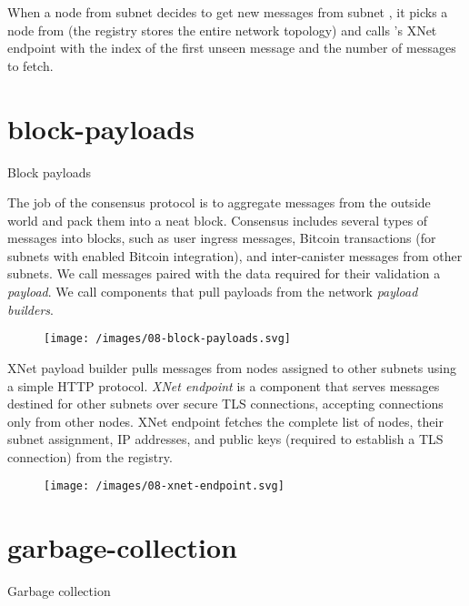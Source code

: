 \documentclass{article}
\begin{document}
When a node from subnet  decides to get new messages from subnet , it picks a node from  (the registry stores the entire network topology) and calls 's XNet endpoint with the index of the first unseen message and the number of messages to fetch.

\section{block-payloads}{Block payloads}

The job of the consensus protocol is to aggregate messages from the outside world and pack them into a neat block.
Consensus includes several types of messages into blocks, such as user ingress messages, Bitcoin transactions (for subnets with enabled Bitcoin integration), and inter-canister messages from other subnets.
We call messages paired with the data required for their validation a \emph{payload}.
We call components that pull payloads from the network \emph{payload builders}.

\begin{figure}[grayscale-diagram]
  \texttt{[image: /images/08-block-payloads.svg]}
\end{figure}

XNet payload builder pulls messages from nodes assigned to other subnets using a simple HTTP protocol.
\emph{XNet endpoint} is a component that serves messages destined for other subnets over secure TLS connections, accepting connections only from other nodes.
XNet endpoint fetches the complete list of nodes, their subnet assignment, IP addresses, and public keys (required to establish a TLS connection) from the registry.

\begin{figure}[grayscale-diagram]
  \texttt{[image: /images/08-xnet-endpoint.svg]}
\end{figure}

\section{garbage-collection}{Garbage collection}
\end{document}
